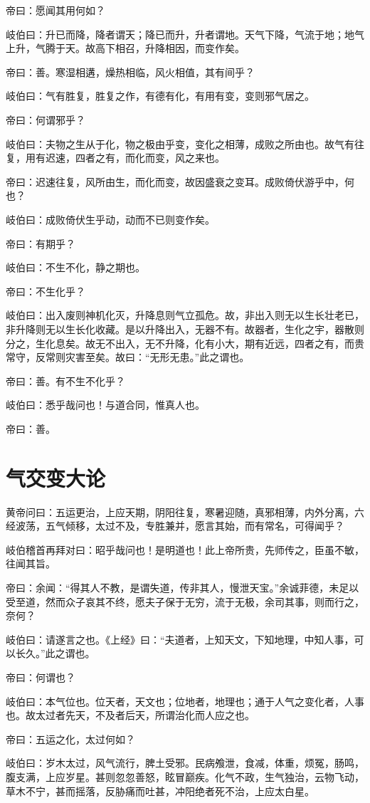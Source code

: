 \documentclass{article}%
\begin{document}
帝曰：愿闻其用何如？

岐伯曰：升已而降，降者谓天；降已而升，升者谓地。天气下降，气流于地；地气上升，气腾于天。故高下相召，升降相因，而变作矣。

帝曰：善。寒湿相遘，燥热相临，风火相值，其有间乎？

岐伯曰：气有胜复，胜复之作，有德有化，有用有变，变则邪气居之。

帝曰：何谓邪乎？

岐伯曰：夫物之生从于化，物之极由乎变，变化之相薄，成败之所由也。故气有往复，用有迟速，四者之有，而化而变，风之来也。

帝曰：迟速往复，风所由生，而化而变，故因盛衰之变耳。成败倚伏游乎中，何也？

岐伯曰：成败倚伏生乎动，动而不已则变作矣。

帝曰：有期乎？

岐伯曰：不生不化，静之期也。

帝曰：不生化乎？

岐伯曰：出入废则神机化灭，升降息则气立孤危。故，非出入则无以生长壮老已，非升降则无以生长化收藏。是以升降出入，无器不有。故器者，生化之宇，器散则分之，生化息矣。故无不出入，无不升降，化有小大，期有近远，四者之有，而贵常守，反常则灾害至矣。故曰：“无形无患。”此之谓也。

帝曰：善。有不生不化乎？

岐伯曰：悉乎哉问也！与道合同，惟真人也。

帝曰：善。
\section{气交变大论}
黄帝问曰：五运更治，上应天期，阴阳往复，寒暑迎随，真邪相薄，内外分离，六经波荡，五气倾移，太过不及，专胜兼并，愿言其始，而有常名，可得闻乎？

岐伯稽首再拜对曰：昭乎哉问也！是明道也！此上帝所贵，先师传之，臣虽不敏，往闻其旨。

帝曰：余闻：“得其人不教，是谓失道，传非其人，慢泄天宝。”余诚菲德，未足以受至道，然而众子哀其不终，愿夫子保于无穷，流于无极，余司其事，则而行之，奈何？

岐伯曰：请遂言之也。《上经》曰：“夫道者，上知天文，下知地理，中知人事，可以长久。”此之谓也。

帝曰：何谓也？

岐伯曰：本气位也。位天者，天文也；位地者，地理也；通于人气之变化者，人事也。故太过者先天，不及者后天，所谓治化而人应之也。

帝曰：五运之化，太过何如？

岐伯曰：岁木太过，风气流行，脾土受邪。民病飧泄，食减，体重，烦冤，肠鸣，腹支满，上应岁星。甚则忽忽善怒，眩冒巅疾。化气不政，生气独治，云物飞动，草木不宁，甚而摇落，反胁痛而吐甚，冲阳绝者死不治，上应太白星。
\end{document}
